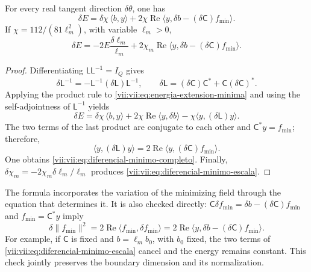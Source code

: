 \begin{theorem}
\label{vii:vii:thm:diferencial-minimo}
For every real tangent direction \(\delta\theta\), one has
\begin{equation}
 \delta E
 =\delta\chi\,\langle b,y\rangle
   +2\chi\operatorname{Re}
       \langle y,\delta b-(\delta\mathsf C)f_{\min}\rangle.
 \label{vii:vii:eq:diferencial-minimo-completo}
\end{equation}
If \(\chi=112/(81\ell_m^2)\), with variable \(\ell_m>0\),
\begin{equation}
 \delta E=-2E\frac{\delta\ell_m}{\ell_m}
 +2\chi_m\operatorname{Re}
       \langle y,\delta b-(\delta\mathsf C)f_{\min}\rangle.
 \label{vii:vii:eq:diferencial-minimo-escala}
\end{equation}
\end{theorem}

\begin{proof}
Differentiating \(\mathsf L\mathsf L^{-1}=I_Q\) gives
\[
 \delta\mathsf L^{-1}
 =-\mathsf L^{-1}(\delta\mathsf L)\mathsf L^{-1},\qquad
 \delta\mathsf L=(\delta\mathsf C)\mathsf C^*
                      +\mathsf C(\delta\mathsf C)^*.
\]
Applying the product rule to \eqref{vii:vii:eq:energia-extension-minima} and using the self-adjointness of \(\mathsf L^{-1}\) yields
\[
 \delta E=\delta\chi\,\langle b,y\rangle
 +2\chi\operatorname{Re}\langle y,\delta b\rangle
 -\chi\langle y,(\delta\mathsf L)y\rangle.
\]
The two terms of the last product are conjugate to each other and \(\mathsf C^*y=f_{\min}\); therefore,
\[
 \langle y,(\delta\mathsf L)y\rangle
 =2\operatorname{Re}\langle y,(\delta\mathsf C)f_{\min}\rangle.
\]
One obtains \eqref{vii:vii:eq:diferencial-minimo-completo}. Finally, \(\delta\chi_m=-2\chi_m\delta\ell_m/\ell_m\) produces \eqref{vii:vii:eq:diferencial-minimo-escala}.
\end{proof}

The formula incorporates the variation of the minimizing field through the equation that determines it. It is also checked directly: \(\mathsf C\delta f_{\min}=\delta b-(\delta\mathsf C)f_{\min}\) and \(f_{\min}=\mathsf C^*y\) imply
\[
 \delta\|f_{\min}\|^2
 =2\operatorname{Re}\langle f_{\min},\delta f_{\min}\rangle
 =2\operatorname{Re}
     \langle y,\delta b-(\delta\mathsf C)f_{\min}\rangle.
\]
For example, if \(\mathsf C\) is fixed and \(b=\ell_m b_0\), with \(b_0\) fixed, the two terms of \eqref{vii:vii:eq:diferencial-minimo-escala} cancel and the energy remains constant. This check jointly preserves the boundary dimension and its normalization.

